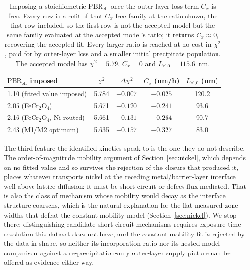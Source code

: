\documentclass[pdflatex,sn-nature]{sn-jnl}
\begin{document}
\begin{table}[htbp]
\centering
\caption{Imposing a stoichiometric $\mathrm{PBR}_\text{eff}$ once the
outer-layer loss term $C_x$ is free. Every row is a refit of that
$C_x$-free family at the ratio shown, the first row included, so the
first row is not the accepted model but the same family evaluated at the
accepted model's ratio; it returns $C_x \approx 0$, recovering the
accepted fit. Every larger ratio is reached at no cost in $\chi^2$, paid
for by outer-layer loss and a smaller initial precipitate population.
The accepted model has $\chi^2 = 5.79$, $C_x = 0$ and
$L_\text{ol,0} = 115.6$~nm.}
\label{tab:pbrclosure}
\begin{tabular}{lcccc}
\toprule
$\mathrm{PBR}_\text{eff}$ imposed & $\chi^2$ & $\Delta\chi^2$ &
$C_x$ (nm/h) & $L_\text{ol,0}$ (nm) \\
\midrule
1.10 \; (fitted value imposed)    & 5.784 & $-0.007$ & $-0.025$ & 120.2 \\
2.05 \; (FeCr$_2$O$_4$)           & 5.671 & $-0.120$ & $-0.241$ & 93.6 \\
2.16 \; (FeCr$_2$O$_4$, Ni routed) & 5.661 & $-0.131$ & $-0.264$ & 90.7 \\
2.43 \; (M1/M2 optimum)           & 5.635 & $-0.157$ & $-0.327$ & 83.0 \\
\bottomrule
\end{tabular}
\end{table}

The third feature the identified kinetics speak to is the one they do
not describe. The order-of-magnitude mobility argument of
Section~\ref{sec:nickel}, which depends on no fitted value and so
survives the rejection of the closure that produced it, places whatever
transports nickel at the receding metal/barrier-layer interface well
above lattice diffusion: it must be short-circuit or defect-flux
mediated. That is also the class of mechanism whose mobility would decay as the
interface structure coarsens, which is the natural explanation for the
flat measured zone widths that defeat the constant-mobility model
(Section~\ref{sec:nickel}). We stop there: distinguishing candidate
short-circuit mechanisms requires exposure-time resolution this dataset
does not have, and the constant-mobility fit is rejected by the data in
shape, so neither its incorporation ratio nor its nested-model
comparison against a re-precipitation-only outer-layer supply picture
can be offered as evidence either way.
\end{document}
